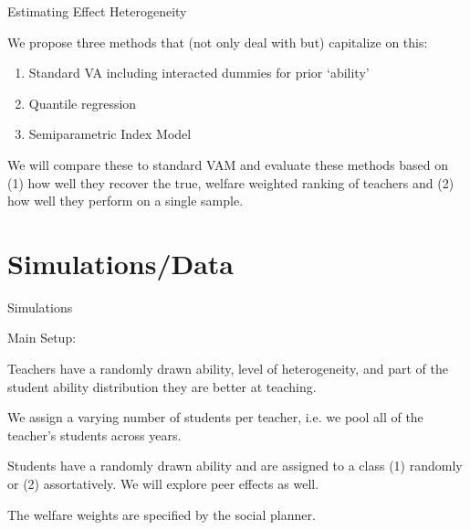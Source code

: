 \documentclass[11pt]{beamer}
\newenvironment{wideitemize}{\itemize\addtolength{\itemsep}{14pt}}{\enditemize}
\begin{document}

\begin{frame}{Estimating Effect Heterogeneity}

    We propose three methods that (not only deal with but) capitalize on this:
    
    \begin{enumerate}
        \item Standard VA including interacted dummies for prior `ability'
        \item Quantile regression
        \item Semiparametric Index Model
    \end{enumerate}
    
    We will compare these to standard VAM and evaluate these methods based on (1) how well they recover the true, welfare weighted ranking of teachers and (2) how well they perform on a single sample.
    
\end{frame}





\section{Simulations/Data}


\begin{frame}{Simulations}

Main Setup:

    \begin{wideitemize}
        \item Teachers have a randomly drawn ability, level of heterogeneity, and part of the student ability distribution they are better at teaching. 
        \item We assign a varying number of students per teacher, i.e. we pool all of the teacher's students across years.
        \item Students have a randomly drawn ability and are assigned to a class (1) randomly or (2) assortatively. We will explore peer effects as well.
        \item The welfare weights are specified by the social planner.
    \end{wideitemize}


\end{frame}
\end{document}
